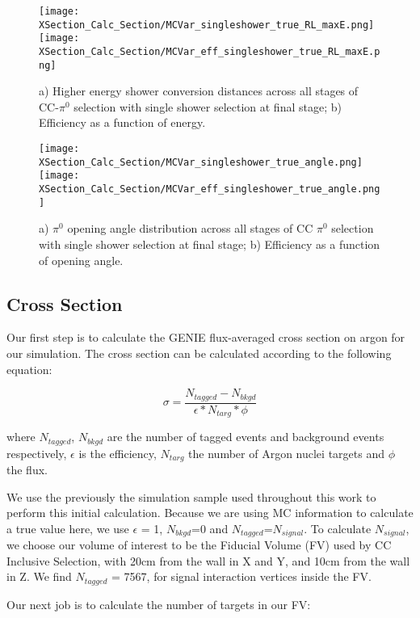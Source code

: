 \begin{figure}[h!]
\centering
\texttt{[image: XSection\_Calc\_Section/MCVar\_singleshower\_true\_RL\_maxE.png]}
\hspace{1 mm}
\texttt{[image: XSection\_Calc\_Section/MCVar\_eff\_singleshower\_true\_RL\_maxE.png]}
\caption{a) Higher energy shower conversion distances across all stages of CC-$\pi^0$ selection with single shower selection at final stage; b) Efficiency as a function of energy. }
\label{fig:pi0_effs_12}
\end{figure}


\begin{figure}[h!]
\texttt{[image: XSection\_Calc\_Section/MCVar\_singleshower\_true\_angle.png]}
\hspace{3 mm}
\texttt{[image: XSection\_Calc\_Section/MCVar\_eff\_singleshower\_true\_angle.png]}
\caption{a) $\pi^0$ opening angle distribution across all stages of CC $\pi^0$ selection with single shower selection at final stage; b) Efficiency as a function of opening angle. }
\label{fig:pi0_effs_13}
\end{figure}

\clearpage
\subsection{Cross Section}

Our first step is to calculate the GENIE flux-averaged cross section on argon for our simulation. The cross section can be calculated according to the following equation:

\begin{equation}
  \sigma = \frac{N_{tagged} - N_{bkgd}}{\epsilon*N_{targ}*\phi}
\end{equation}

\noindent where $N_{tagged}$, $N_{bkgd}$ are the number of tagged events and background events respectively, $\epsilon$ is the efficiency, $N_{targ}$ the number of Argon nuclei targets and $\phi$ the flux. 
\par We use the previously the simulation sample used throughout this work to perform this initial calculation.  Because we are using MC information to calculate a true value here, we use $\epsilon$ = 1, $N_{bkgd}$=0 and $N_{tagged}$=$N_{signal}$.  To calculate $N_{signal}$, we choose our volume of interest to be the Fiducial Volume (FV) used by CC Inclusive Selection, with 20cm from the wall in X and Y, and 10cm from the wall in Z. We find $N_{tagged}$ = 7567, for signal interaction vertices inside the FV. 
\par Our next job is to calculate the number of targets in our FV:

